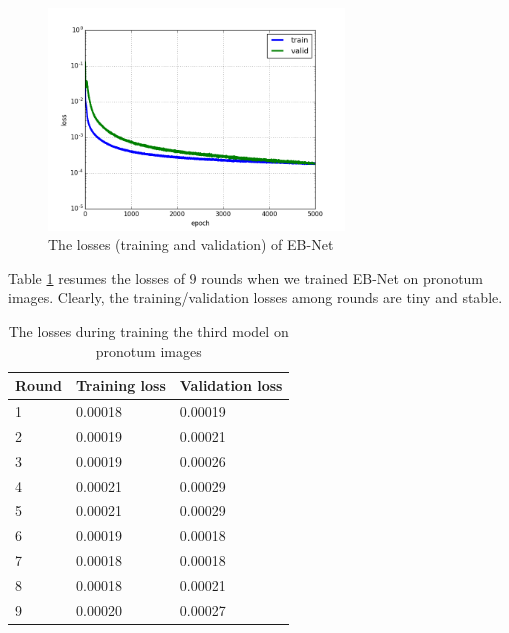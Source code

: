 \documentclass[review]{elsarticle}
\begin{document}
\begin{figure}[h!]
    \centering
    \includegraphics[width=0.7\textwidth]{images/model3_loss}
    \caption{The losses (training and validation) of EB-Net}
    \label{figloss3}
\end{figure}

Table \ref{tbltrainingloss} resumes the losses of $9$ rounds when we trained EB-Net on pronotum images. Clearly, the training/validation losses among rounds are tiny and stable.

\begin{table}[h!]
	\centering
	\begin{tabular}{l l l}
	Round & Training loss & Validation loss \\ \hline
	1 & 0.00018 & 0.00019  \\ \hline
	2 & 0.00019 & 0.00021 \\ \hline
	3 & 0.00019 & 0.00026 \\ \hline
	4 & 0.00021 & 0.00029 \\ \hline
	5 & 0.00021 & 0.00029 \\ \hline
	6 & 0.00019 & 0.00018 \\ \hline
	7 & 0.00018 & 0.00018 \\ \hline
	8 & 0.00018 & 0.00021 \\ \hline
	9 & 0.00020 & 0.00027 \\ \hline
	\end{tabular}
	\caption{\small{The losses during training the third model on pronotum images}}
	\label{tbltrainingloss}
\end{table}
\end{document}
